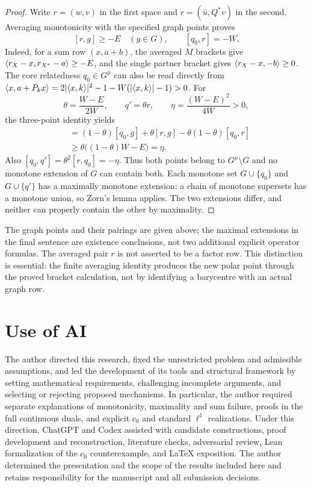 \begin{proof}
Write $r=(w,v)$ in the first space and
$r=(\bar u,Q^*v)$ in the second. Averaging monotonicity with
the specified graph points proves
\[
[r,g]\ge-E\quad(g\in G),\qquad [q_0,r]=-W.
\]
Indeed, for a sum row $(x,a+b)$, the averaged $M$ brackets
give $\langle r_X-x,r_{X^*}-a\rangle\ge-E$, and the single
partner bracket gives $\langle r_X-x,-b\rangle\ge0$.
The core relatedness $q_0\in G^\mu$ can also be read directly
from $\langle x,a+P_kx\rangle=2|\langle x,k\rangle|^2-1-W(|\langle x,k\rangle|-1)>0$.
For
\[
\theta=\frac{W-E}{2W},\qquad q'=\theta r,
\qquad \eta=\frac{(W-E)^2}{4W}>0,
\]
the three-point identity yields
\begin{align*}
[q',g]
&=(1-\theta)[q_0,g]+\theta[r,g]
                 -\theta(1-\theta)[q_0,r]\\
&\ge\theta\bigl((1-\theta)W-E\bigr)=\eta.
\end{align*}
Also $[q_0,q']=\theta^2[r,q_0]=-\eta$.
Thus both points belong to $G^\mu\setminus G$ and no monotone
extension of $G$ can contain both. Each monotone set
$G\cup\{q_0\}$ and $G\cup\{q'\}$ has a maximally monotone
extension: a chain of monotone supersets has a monotone union,
so Zorn's lemma applies. The two extensions differ, and neither
can properly contain the other by maximality.
\end{proof}
The graph points and their pairings are given above; the maximal
extensions in the final sentence are existence conclusions, not
two additional explicit operator formulas. The averaged pair $r$
is not asserted to be a factor row. This distinction is essential:
the finite averaging identity produces the new polar point through
the proved bracket calculation, not by identifying a barycentre
with an actual graph row.




\section*{Use of AI}
The author directed this research, fixed the unrestricted problem and
admissible assumptions, and led the development of its tools and structural
framework by setting mathematical requirements, challenging incomplete
arguments, and selecting or rejecting proposed mechanisms. In particular,
the author required separate explanations of monotonicity, maximality and
sum failure, proofs in the full continuous duals, and explicit $c_0$ and
standard $\ell^1$ realizations. Under this direction, ChatGPT and Codex
assisted with candidate constructions, proof development and reconstruction,
literature checks, adversarial review, Lean formalization of the $c_0$
counterexample, and LaTeX exposition. The author determined the presentation
and the scope of the results included here and retains responsibility for
the manuscript and all submission decisions.


